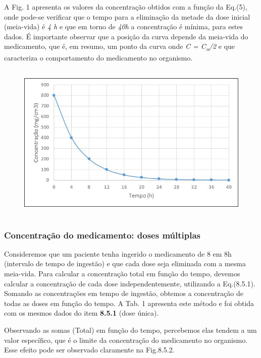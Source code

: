 A Fig. 1 apresenta os valores da concentração obtidos com a função da Eq.(5), onde pode-se verificar que o tempo para a eliminação da metade da dose inicial (meia-vida) é \textit{4 h} e que em torno de \textit{40h} a concentração é mínima, para estes dados. É importante observar que a posição da curva depende da meia-vida do medicamento, que é, em resumo, um ponto da curva onde \textit{C = C\textsubscript{o}/2} e que caracteriza o comportamento do medicamento no organismo. 

\begin{figure}[H]
	\begin{Center}
		\includegraphics[width=5.01in,height=3.01in]{capitulos/logaritmos_e_funcao_logaritmica/media/image11.jpeg}
	\end{Center}
\end{figure}

\subsubsection{Concentração do medicamento: doses múltiplas}

Consideremos que um paciente tenha ingerido o medicamento de 8 em 8h (intervalo de tempo de ingestão) e que cada dose seja eliminada com a mesma meia-vida. Para calcular a concentração total em função do tempo, devemos calcular a concentração de cada dose independentemente, utilizando a Eq.(8.5.1). Somando as concentrações em tempo de ingestão, obtemos a concentração de todas as doses em função do tempo. A Tab. 1 apresenta este método e foi obtida com os mesmos dados do item \textbf{8.5.1} (dose única). 

Observando as somas (Total) em função do tempo, percebemos elas tendem a um valor específico, que é o limite da concentração do medicamento no organismo. Esse efeito pode ser observado claramente na Fig.8.5.2.


